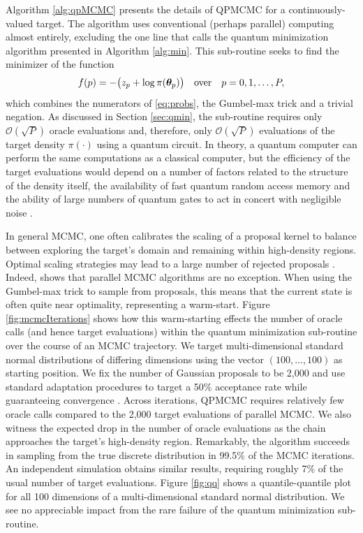 \documentclass[12pt]{article} %
\begin{document}
Algorithm \ref{alg:qpMCMC} presents the details of QPMCMC for a continuously-valued target.  The algorithm uses conventional (perhaps parallel) computing almost entirely, excluding the one line that calls the quantum minimization algorithm presented in Algorithm \ref{alg:min}. 
This sub-routine seeks to find the minimizer of the function
\begin{align}\label{eq:objective}
f(p)= -\big(z_{p}+ \log\pi(\boldsymbol{\theta}_{p}) \big) \quad \mbox{over} \quad p=0,1,\dots, P,
\end{align} 
which combines the numerators of \eqref{eq:probs}, the Gumbel-max trick and a trivial negation.  As discussed in Section \ref{sec:qmin}, the sub-routine requires only $\mathcal{O}(\sqrt{P})$ oracle evaluations and, therefore, only $\mathcal{O}(\sqrt{P})$ evaluations of the target density $\pi(\cdot)$ using a quantum circuit.  In theory, a quantum computer can perform the same computations as a classical computer, but the efficiency of the target evaluations would depend on a number of factors related to the structure of the density itself, the availability of fast quantum random access memory \citep{giovannetti2008quantum} and the ability of large numbers of quantum gates to act in concert with negligible noise \citep{kielpinski2002architecture,erhard2019characterizing}.



In general MCMC, one often calibrates the scaling of a proposal kernel to balance between exploring the target's domain and remaining within high-density regions.  Optimal scaling strategies may lead to a large number of rejected proposals \citep{roberts2001optimal}.  Indeed, \citet{holbrook2021generating} shows that parallel MCMC algorithms are no exception. When using the Gumbel-max trick to sample from proposals, this means that the current state is often quite near optimality, representing a warm-start.  Figure \ref{fig:mcmcIterations} shows how this warm-starting effects the number of oracle calls (and hence target evaluations) within the quantum minimization sub-routine over the course of an MCMC trajectory.  We target multi-dimensional standard normal distributions of differing dimensions using the vector $(100,\dots,100)$ as starting position. We fix the number of Gaussian proposals to be 2,000 and use standard adaptation procedures to target a 50\% acceptance rate while guaranteeing convergence \citep{rosenthal2011optimal}. Across iterations, QPMCMC requires relatively few oracle calls compared to the 2,000 target evaluations of parallel MCMC. We also witness the expected drop in the number of oracle evaluations as the chain approaches the target's high-density region. Remarkably, the algorithm succeeds in sampling from the true discrete distribution in 99.5\% of the MCMC iterations. An independent simulation obtains similar results, requiring roughly 7\% of the usual number of target evaluations. Figure \ref{fig:qq} shows a quantile-quantile plot for all 100 dimensions of a multi-dimensional standard normal distribution. We see no appreciable impact from the rare failure of the quantum minimization sub-routine.
\end{document}
